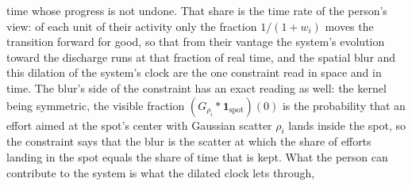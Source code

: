 \documentclass{article}
\begin{document}
time whose progress is not undone. That share is the time rate of the person's view: of each unit of their activity only the fraction $1/(1+w_i)$ moves the transition forward for good, so that from their vantage the system's evolution toward the discharge runs at that fraction of real time, and the spatial blur and this dilation of the system's clock are the one constraint read in space and in time. The blur's side of the constraint has an exact reading as well: the kernel being symmetric, the visible fraction $(G_{\rho_i} \ast \mathbf{1}_{\mathrm{spot}})(0)$ is the probability that an effort aimed at the spot's center with Gaussian scatter $\rho_i$ lands inside the spot, so the constraint says that the blur is the scatter at which the share of efforts landing in the spot equals the share of time that is kept. What the person can contribute to the system is what the dilated clock lets through,
\end{document}

